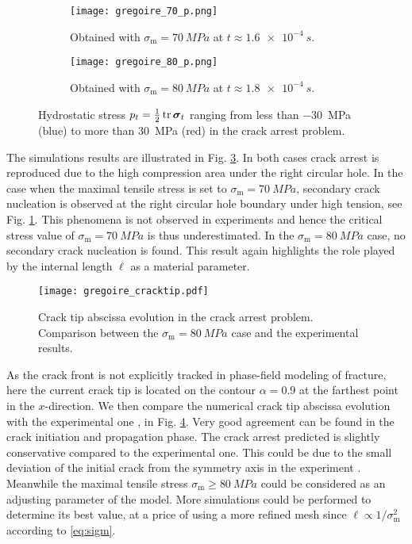 \begin{figure}[htbp]
\centering
\begin{subfigure}[b]{0.485\textwidth}
\centering
\texttt{[image: gregoire\_70\_p.png]}
\caption{Obtained with $\sigma_\mathrm{m}=\SI{70}{MPa}$ at $t\approx\SI{1.6e-4}{s}$.} \label{fig:sig70}
\end{subfigure}
\begin{subfigure}[b]{0.485\textwidth}
\centering
\texttt{[image: gregoire\_80\_p.png]}
\caption{Obtained with $\sigma_\mathrm{m}=\SI{80}{MPa}$ at $t\approx\SI{1.8e-4}{s}$.} \label{fig:sig80}
\end{subfigure}
\caption{Hydrostatic stress $p_t=\frac{1}{2}\tr\sig_t$ ranging from less than \SI{-30}{MPa} (blue) to more than \SI{30}{MPa} (red) in the crack arrest problem.} \label{fig:siggregoire}
\end{figure}

The simulations results are illustrated in Fig. \ref{fig:siggregoire}. In both cases crack arrest is reproduced due to the high compression area under the right circular hole. In the case when the maximal tensile stress is set to $\sigma_\mathrm{m}=\SI{70}{MPa}$, secondary crack nucleation is observed at the right circular hole boundary under high tension, see Fig. \ref{fig:sig70}. This phenomena is not observed in experiments and hence the critical stress value of $\sigma_\mathrm{m}=\SI{70}{MPa}$ is thus underestimated. In the $\sigma_\mathrm{m}=\SI{80}{MPa}$ case, no secondary crack nucleation is found. This result again highlights the role played by the internal length $\ell$ as a material parameter.
\begin{figure}[htbp]
\centering
\texttt{[image: gregoire\_cracktip.pdf]}
\caption{Crack tip abscissa evolution in the crack arrest problem. Comparison between the $\sigma_\mathrm{m}=\SI{80}{MPa}$ case and the experimental results.} \label{fig:cracktip}
\end{figure}

As the crack front is not explicitly tracked in phase-field modeling of fracture, here the current crack tip is located on the contour $\alpha=0.9$ at the farthest point in the $x$-direction. We then compare the numerical crack tip abscissa evolution with the experimental one \cite{HaboussaGregoireElguedjMaigreCombescure:2011}, in Fig. \ref{fig:cracktip}. Very good agreement can be found in the crack initiation and propagation phase. The crack arrest predicted is slightly conservative compared to the experimental one. This could be due to the small deviation of the initial crack from the symmetry axis in the experiment \cite{HaboussaGregoireElguedjMaigreCombescure:2011}. Meanwhile the maximal tensile stress $\sigma_\mathrm{m}\geq\SI{80}{MPa}$ could be considered as an adjusting parameter of the model. More simulations could be performed to determine its best value, at a price of using a more refined mesh since $\ell\propto1/\sigma_\mathrm{m}^2$ according to \eqref{eq:sigm}.

